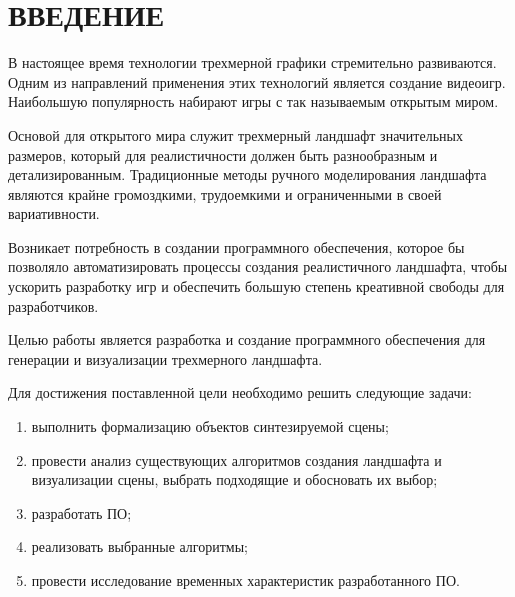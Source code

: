 
\chapter*{ВВЕДЕНИЕ}


В настоящее время технологии трехмерной графики стремительно развиваются.
Одним из направлений применения этих технологий является создание видеоигр.
Наибольшую популярность набирают игры с так называемым открытым миром.

Основой для открытого мира служит трехмерный ландшафт значительных размеров, который для реалистичности должен быть разнообразным и детализированным.
Традиционные методы ручного моделирования ландшафта являются крайне громоздкими, трудоемкими и ограниченными в своей вариативности. 

Возникает потребность в создании программного обеспечения, которое бы позволяло автоматизировать процессы создания реалистичного ландшафта, чтобы ускорить разработку игр и обеспечить большую степень креативной свободы для разработчиков.

Целью работы является разработка и создание программного обеспечения для генерации и визуализации трехмерного ландшафта.

Для достижения поставленной цели необходимо решить следующие задачи: 

\begin{enumerate}[label={\arabic*)}]
	\item выполнить формализацию объектов синтезируемой сцены;
	\item провести анализ существующих алгоритмов создания ландшафта и визуализации сцены, выбрать подходящие и обосновать их выбор;
	\item разработать ПО;
	\item реализовать выбранные алгоритмы;
	\item провести исследование временных характеристик разработанного ПО.
\end{enumerate}

